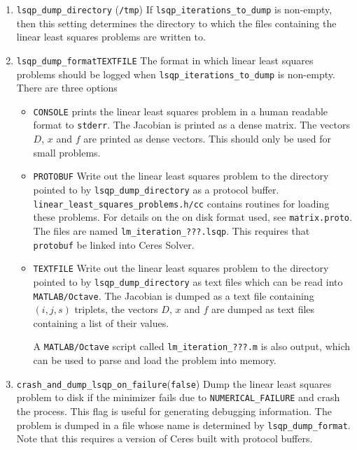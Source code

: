 \begin{enumerate}
\item{\texttt{lsqp\_dump\_directory}} (\texttt{/tmp})
 If \texttt{lsqp\_iterations\_to\_dump} is non-empty, then this setting determines the directory to which the files containing the linear least squares problems are written to.


\item{\texttt{lsqp\_dump\_format}}{\texttt{TEXTFILE}} The format in which linear least squares problems should be logged
when \texttt{lsqp\_iterations\_to\_dump} is non-empty.  There are three options
\begin{itemize}
\item{\texttt{CONSOLE}} prints the linear least squares problem in a human readable format
  to \texttt{stderr}. The Jacobian is printed as a dense matrix. The vectors
   $D$, $x$ and $f$ are printed as dense vectors. This should only be used
   for small problems.
\item{\texttt{PROTOBUF}}  
   Write out the linear least squares problem to the directory
   pointed to by \texttt{lsqp\_dump\_directory} as a protocol
   buffer. \texttt{linear\_least\_squares\_problems.h/cc} contains routines for
   loading these problems. For details on the on disk format used,
   see \texttt{matrix.proto}. The files are named \texttt{lm\_iteration\_???.lsqp}. This requires that \texttt{protobuf} be linked into Ceres Solver.
\item{\texttt{TEXTFILE}}
   Write out the linear least squares problem to the directory
   pointed to by \texttt{lsqp\_dump\_directory} as text files
   which can be read into \texttt{MATLAB/Octave}. The Jacobian is dumped as a
   text file containing $(i,j,s)$ triplets, the vectors $D$, $x$ and $f$ are
   dumped as text files containing a list of their values.
  
   A \texttt{MATLAB/Octave} script called \texttt{lm\_iteration\_???.m} is also output,
   which can be used to parse and load the problem into memory.
\end{itemize}


\item{\texttt{crash\_and\_dump\_lsqp\_on\_failure}}(\texttt{false})
 Dump the linear least squares problem to disk if the minimizer
     fails due to \texttt{NUMERICAL\_FAILURE} and crash the process. This flag
     is useful for generating debugging information. The problem is
     dumped in a file whose name is determined by
   \texttt{lsqp\_dump\_format}. Note that this requires a version of Ceres built with protocol buffers.


\end{enumerate}
